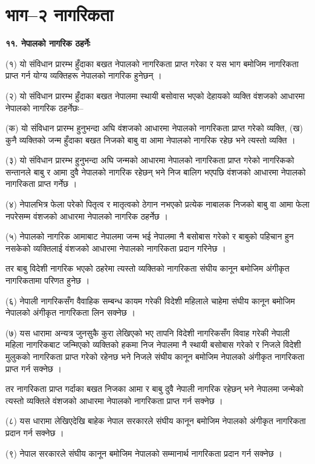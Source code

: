 \section{भाग–२ नागरिकता}

\textbf{११. नेपालको नागरिक ठहर्नेः}

(१) यो संविधान प्रारम्भ हुँदाका बखत नेपालको नागरिकता प्राप्त गरेका र यस भाग बमोजिम नागरिकता प्राप्त गर्न योग्य
व्यक्तिहरू नेपालको नागरिक हुनेछन् ।

(२) यो संविधान प्रारम्भ हुँदाका बखत नेपालमा स्थायी बसोवास भएको देहायको व्यक्ति वंशजको आधारमा नेपालको नागरिक ठहर्नेछः–

(क) यो संविधान प्रारम्भ हुनुभन्दा अघि वंशजको आधारमा नेपालको नागरिकता प्राप्त गरेको व्यक्ति,
(ख) कुनै व्यक्तिको जन्म हुँदाका बखत निजको बाबु वा आमा नेपालको नागरिक रहेछ भने त्यस्तो व्यक्ति ।

(३) यो संविधान प्रारम्भ हुनुभन्दा अघि जन्मको आधारमा नेपालको नागरिकता प्राप्त गरेको नागरिकको सन्तानले बाबु र आमा दुवै नेपालको नागरिक रहेछन् भने निज बालिग भएपछि वंशजको आधारमा नेपालको नागरिकता प्राप्त गर्नेछ ।

(४) नेपालभित्र फेला परेको पितृत्व र मातृत्वको ठेगान नभएको प्रत्येक नाबालक निजको बाबु वा आमा फेला नपरेसम्म वंशजको आधारमा
नेपालको नागरिक ठहर्नेछ ।

(५) नेपालको नागरिक आमाबाट नेपालमा जन्म भई नेपालमा नै बसोबास गरेको र बाबुको पहिचान हुन नसकेको व्यक्तिलाई वंशजको
आधारमा नेपालको नागरिकता प्रदान गरिनेछ ।

तर बाबु विदेशी नागरिक भएको ठहरेमा त्यस्तो व्यक्तिको नागरिकता संघीय कानून बमोजिम अंगीकृत नागरिकतामा परिणत हुनेछ ।

(६) नेपाली नागरिकसँग वैवाहिक सम्बन्ध कायम गरेकी विदेशी महिलाले चाहेमा संघीय कानून बमोजिम नेपालको अंगीकृत नागरिकता लिन सक्नेछ ।

(७) यस धारामा अन्यत्र जुनसुकै कुरा लेखिएको भए तापनि विदेशी नागरिकसँग विवाह गरेकी नेपाली महिला नागरिकबाट जन्मिएको व्यक्तिको हकमा निज नेपालमा नै स्थायी बसोबास गरेको र निजले विदेशी मुलुकको नागरिकता प्राप्त गरेको रहेनछ भने निजले संघीय कानून बमोजिम नेपालको अंगीकृत नागरिकता प्राप्त गर्न सक्नेछ ।

तर नागरिकता प्राप्त गर्दाका बखत निजका आमा र बाबु दुवै नेपाली नागरिक रहेछन् भने नेपालमा जन्मेको त्यस्तो व्यक्तिले वंशजको आधारमा नेपालको नागरिकता प्राप्त गर्न सक्नेछ ।

(८) यस धारामा लेखिएदेखि बाहेक नेपाल सरकारले संघीय कानून बमोजिम नेपालको अंगीकृत नागरिकता प्रदान गर्न सक्नेछ ।

(९) नेपाल सरकारले संघीय कानून बमोजिम नेपालको सम्मानार्थ नागरिकता प्रदान गर्न सक्नेछ ।

